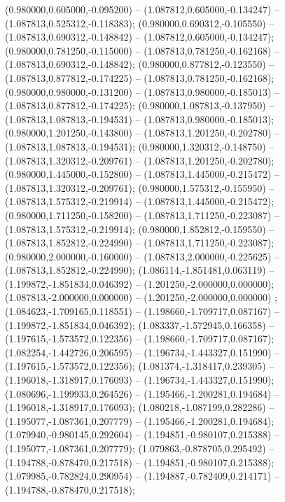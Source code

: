  (0.980000,0.605000,-0.095200) -- (1.087812,0.605000,-0.134247) -- (1.087813,0.525312,-0.118383);
 (0.980000,0.690312,-0.105550) -- (1.087813,0.690312,-0.148842) -- (1.087812,0.605000,-0.134247);
 (0.980000,0.781250,-0.115000) -- (1.087813,0.781250,-0.162168) -- (1.087813,0.690312,-0.148842);
 (0.980000,0.877812,-0.123550) -- (1.087813,0.877812,-0.174225) -- (1.087813,0.781250,-0.162168);
 (0.980000,0.980000,-0.131200) -- (1.087813,0.980000,-0.185013) -- (1.087813,0.877812,-0.174225);
 (0.980000,1.087813,-0.137950) -- (1.087813,1.087813,-0.194531) -- (1.087813,0.980000,-0.185013);
 (0.980000,1.201250,-0.143800) -- (1.087813,1.201250,-0.202780) -- (1.087813,1.087813,-0.194531);
 (0.980000,1.320312,-0.148750) -- (1.087813,1.320312,-0.209761) -- (1.087813,1.201250,-0.202780);
 (0.980000,1.445000,-0.152800) -- (1.087813,1.445000,-0.215472) -- (1.087813,1.320312,-0.209761);
 (0.980000,1.575312,-0.155950) -- (1.087813,1.575312,-0.219914) -- (1.087813,1.445000,-0.215472);
 (0.980000,1.711250,-0.158200) -- (1.087813,1.711250,-0.223087) -- (1.087813,1.575312,-0.219914);
 (0.980000,1.852812,-0.159550) -- (1.087813,1.852812,-0.224990) -- (1.087813,1.711250,-0.223087);
 (0.980000,2.000000,-0.160000) -- (1.087813,2.000000,-0.225625) -- (1.087813,1.852812,-0.224990);
 (1.086114,-1.851481,0.063119) -- (1.199872,-1.851834,0.046392) -- (1.201250,-2.000000,0.000000);
 (1.087813,-2.000000,0.000000) -- (1.201250,-2.000000,0.000000) ;
 (1.084623,-1.709165,0.118551) -- (1.198660,-1.709717,0.087167) -- (1.199872,-1.851834,0.046392);
 (1.083337,-1.572945,0.166358) -- (1.197615,-1.573572,0.122356) -- (1.198660,-1.709717,0.087167);
 (1.082254,-1.442726,0.206595) -- (1.196734,-1.443327,0.151990) -- (1.197615,-1.573572,0.122356);
 (1.081374,-1.318417,0.239305) -- (1.196018,-1.318917,0.176093) -- (1.196734,-1.443327,0.151990);
 (1.080696,-1.199933,0.264526) -- (1.195466,-1.200281,0.194684) -- (1.196018,-1.318917,0.176093);
 (1.080218,-1.087199,0.282286) -- (1.195077,-1.087361,0.207779) -- (1.195466,-1.200281,0.194684);
 (1.079940,-0.980145,0.292604) -- (1.194851,-0.980107,0.215388) -- (1.195077,-1.087361,0.207779);
 (1.079863,-0.878705,0.295492) -- (1.194788,-0.878470,0.217518) -- (1.194851,-0.980107,0.215388);
 (1.079985,-0.782824,0.290954) -- (1.194887,-0.782409,0.214171) -- (1.194788,-0.878470,0.217518);
